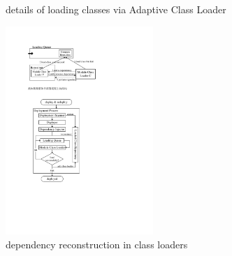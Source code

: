 \documentclass[conference]{IEEEtran}
\begin{document}
\begin{figure}[ht]
\centering
{}
\hfil
{}
\hfil
{}
\caption{details of loading classes via Adaptive Class Loader}
\label{fig:loading_queue}
\end{figure}

\begin{figure}[ht]
\centering
\includegraphics[width=2.2in]{ProcessReconstructionCL.pdf}
\caption{dependency reconstruction in class loaders}
\label{fig:reconstruction_CL}
\end{figure}
\end{document}

